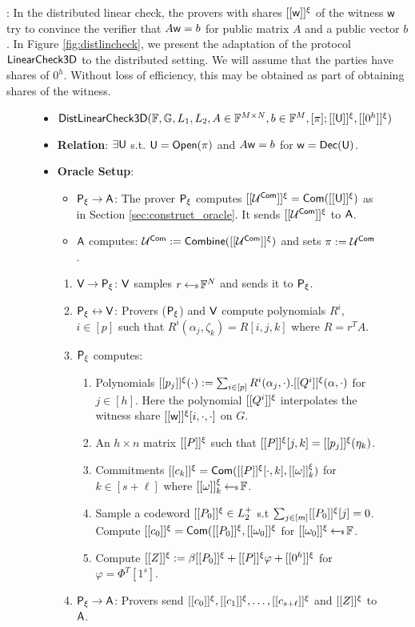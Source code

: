 : In the distributed linear check, the
provers with shares $[[{\mathsf{w}}]]^\xi$ of the witness $\mathsf{w}$ try to convince the
verifier that $A\mathsf{w}=b$ for public matrix $A$ and a public vector $b$. In Figure
\ref{fig:distlincheck}, we present the adaptation of the protocol $\mathsf{LinearCheck3D}$ to
the distributed setting. We will assume that the parties have shares of $0^h$.
Without loss of efficiency, this may be obtained as part of obtaining shares of
the witness.

\begin{figure}[h!]
\centering
\begin{framed}
\begin{itemize}
\item {$\mathsf{DistLinearCheck3D}(\mathbb{F},\mathbb{G},L_1,L_2,A\in \mathbb{F}^{M\times N},b\in
\mathbb{F}^M,[\pi];[[{\mathsf{U}}]]^\xi,[[{0^h}]]^\xi)$}
\item {\bf Relation}: $\exists \mathsf{U}$ s.t. $\mathsf{U}=\mathsf{Open}(\pi)$ and $A\mathsf{w} = b$
for $\mathsf{w}=\mathsf{Dec}(\mathsf{U})$.
\item {\bf Oracle Setup}: 
	\begin{itemize}
	\item $\mathsf{P}_\xi\rightarrow\mathsf{A}$: The prover $\mathsf{P}_\xi$ computes
$[[{\mathcal{U}^{\mathsf{Com}}}]]^\xi = \mathsf{Com}([[{\mathsf{U}}]]^\xi)$ as in Section
\ref{sec:construct_oracle}. It sends $[[{\mathcal{U}^{\mathsf{Com}}}]]^\xi$ to $\mathsf{A}$. 
	\item {\color{red} $\mathsf{A}$ computes: $\mathcal{U}^{\mathsf{Com}} := \mathsf{Combine}([[{\mathcal{U}^{\mathsf{Com}}}]]^\xi)$ and
sets $\pi := \mathcal{U}^{\mathsf{Com}}$}.
	\end{itemize}
\begin{enumerate}[{\rm 1.}]
\item $\mathsf{V}\rightarrow\mathsf{P}_\xi$: $\mathsf{V}$ samples $r\hskip2.3pt{\gets\!\!\mbox{\tiny${\$}$\normalsize}}\, \mathbb{F}^N$ and
sends it to $\mathsf{P}_\xi$.
\item $\mathsf{P}_\xi\leftrightarrow\mathsf{V}$: Provers ($\mathsf{P}_\xi$) and $\mathsf{V}$
compute polynomials $R^i$, $i\in [p]$ such that
$R^i(\alpha_j,\zeta_k)=R[i,j,k]$ where $R=r^TA$. 
\item $\mathsf{P}_\xi$ computes:
	\begin{enumerate}
	\item Polynomials $[[{p_j}]]^\xi(\cdot) := \sum_{i\in
[p]}R^i(\alpha_j,\cdot).[[{Q^i}]]^\xi(\alpha,\cdot)$ for $j\in [h]$. Here the
polynomial $[[{Q^i}]]^\xi$ interpolates the witness share
$[[{\mathsf{w}}]]^\xi[i,\cdot,\cdot]$ on $G$.
	\item An $h\times n$ matrix $[[{P}]]^\xi$ such that $[[{P}]]^\xi[j,k]=[[{p_j}]]^\xi(\eta_k)$.
	\item Commitments $[[{c_k}]]^\xi=\mathsf{Com}([[{P}]]^\xi[\cdot,k],[[{\omega}]]^\xi_k)$ for $k\in [s+\ell]$
where $[[{\omega}]]^\xi_k\hskip2.3pt{\gets\!\!\mbox{\tiny${\$}$\normalsize}}\, \mathbb{F}$.
	\item Sample a codeword $[[{P_0}]]^\xi\in L^{+}_2$ s.t $\sum_{j\in
[m]}[[{P_0}]]^\xi[j]=0$.
Compute $[[{c_0}]]^\xi=\mathsf{Com}([[{P_0}]]^\xi,[[{\omega_0}]]^\xi$ for $[[{\omega_0}]]^\xi\hskip2.3pt{\gets\!\!\mbox{\tiny${\$}$\normalsize}}\, \mathbb{F}$.
	\item Compute $[[{Z}]]^\xi := \beta[[{P_0}]]^\xi + [[{P}]]^\xi\varphi + [[{0^h}]]^\xi$ for
$\varphi=\Phi^T[1^s]$.
	\end{enumerate}
\item $\mathsf{P}_\xi\rightarrow\mathsf{A}$: Provers send
$[[{c_0}]]^\xi,[[{c_1}]]^\xi,\ldots,[[{c_{s+\ell}}]]^\xi$ and $[[{Z}]]^\xi$ to $\mathsf{A}$.


\end{enumerate}
\end{itemize}
\end{framed}
\end{figure}
